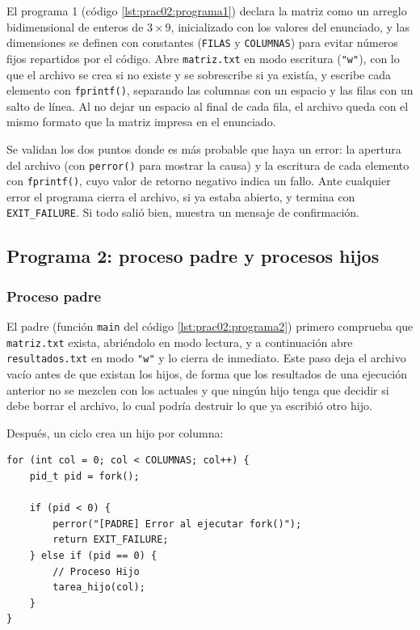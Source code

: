 El programa 1 (código \ref{lst:prac02:programa1}) declara la matriz como un arreglo bidimensional de enteros de $3 \times 9$, inicializado con los valores del enunciado, y las dimensiones se definen con constantes (\texttt{FILAS} y \texttt{COLUMNAS}) para evitar números fijos repartidos por el código. Abre \texttt{matriz.txt} en modo escritura (\texttt{"w"}), con lo que el archivo se crea si no existe y se sobrescribe si ya existía, y escribe cada elemento con \texttt{fprintf()}, separando las columnas con un espacio y las filas con un salto de línea. Al no dejar un espacio al final de cada fila, el archivo queda con el mismo formato que la matriz impresa en el enunciado.

Se validan los dos puntos donde es más probable que haya un error: la apertura del archivo (con \texttt{perror()} para mostrar la causa) y la escritura de cada elemento con \texttt{fprintf()}, cuyo valor de retorno negativo indica un fallo. Ante cualquier error el programa cierra el archivo, si ya estaba abierto, y termina con \texttt{EXIT\_FAILURE}. Si todo salió bien, muestra un mensaje de confirmación.

\subsection{Programa 2: proceso padre y procesos hijos}
\label{sec:prac02:programa2}

\subsubsection{Proceso padre}
El padre (función \texttt{main} del código \ref{lst:prac02:programa2}) primero comprueba que \texttt{matriz.txt} exista, abriéndolo en modo lectura, y a continuación abre \texttt{resultados.txt} en modo \texttt{"w"} y lo cierra de inmediato. Este paso deja el archivo vacío antes de que existan los hijos, de forma que los resultados de una ejecución anterior no se mezclen con los actuales y que ningún hijo tenga que decidir si debe borrar el archivo, lo cual podría destruir lo que ya escribió otro hijo.

Después, un ciclo crea un hijo por columna:

\begin{lstlisting}[style=C]
for (int col = 0; col < COLUMNAS; col++) {
    pid_t pid = fork();

    if (pid < 0) {
        perror("[PADRE] Error al ejecutar fork()");
        return EXIT_FAILURE;
    } else if (pid == 0) {
        // Proceso Hijo
        tarea_hijo(col);
    }
}
\end{lstlisting}

